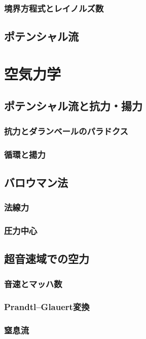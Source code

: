 \documentclass[uplatex,dvipdfmx,a4j,11pt]{jsreport}
\numberwithin{equation}{chapter}
\begin{document}
\subsection{境界方程式とレイノルズ数}


\section{ポテンシャル流}

\chapter{空気力学}

\section{ポテンシャル流と抗力・揚力}
\subsection{抗力とダランベールのパラドクス}

\subsection{循環と揚力}

\section{バロウマン法}
\subsection{法線力}
\subsection{圧力中心}


\section{超音速域での空力}
\subsection{音速とマッハ数}

\subsection{Prandtl--Glauert変換}

\subsection{窒息流}
\end{document}
